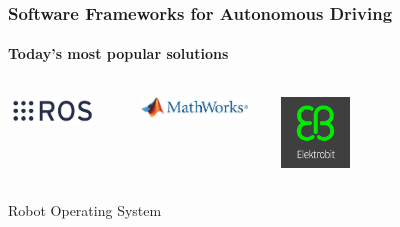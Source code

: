 \begin{frame}
\frametitle{Software Frameworks for Autonomous Driving}
\framesubtitle{Today's most popular solutions}
\centering
\begin{columns}[]
    \begin{column}{0.33\textwidth}
        \centering
        \includegraphics[width=0.8\textwidth]{images/logo_ros.png}\\
    \end{column}
    \begin{column}{0.33\textwidth}
        \centering
        \includegraphics[width=0.9\textwidth]{images/logo_mathworks.jpg}\\
    \end{column}
    \begin{column}{0.33\textwidth}
        \centering
        \includegraphics[width=0.3\textwidth]{images/logo_elektrobit.jpg}\\
    \end{column}
\end{columns}
\vspace{0.2cm}
\begin{columns}[]
    \begin{column}{0.33\textwidth}
        \centering
        \footnotesize
        Robot Operating System\footnotemark[1]\\
    \end{column}
    \begin{column}{0.33\textwidth}

\end{column}
\end{columns}
\end{frame}
